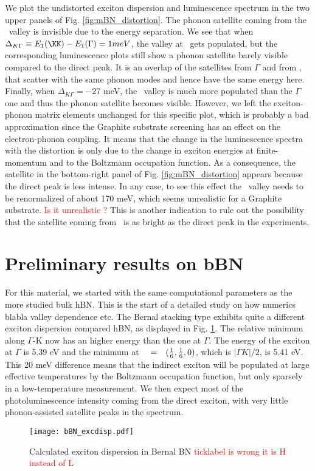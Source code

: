 We plot the undistorted exciton dispersion and luminescence spectrum in the two upper panels of Fig. \ref{fig:mBN_distortion}. The phonon satellite coming from the \KK~valley is invisible due to the energy separation. We see that when $\Delta_{K\Gamma} \equiv E_1(\KK) - E_1(\Gamma) = 1 meV$, the valley at \KK~gets populated, but the corresponding luminescence plots still show a phonon satellite barely visible compared to the direct peak. It is an overlap of the satellites from $\Gamma$ and from \KK, that scatter with the same phonon modes and hence have the same energy here. Finally, when $\Delta_{K\Gamma} = -27$ meV, the \KK~valley is much more populated than the $\Gamma$ one and thus the phonon satellite becomes visible. However, we left the exciton-phonon matrix elements unchanged for this specific plot, which is probably a bad approximation since the Graphite substrate screening has an effect on the electron-phonon coupling.\cite{sohier2021remote} It means that the change in the luminescence spectra with the distortion is only due to the change in exciton energies at finite-momentum and to the Boltzmann occupation function. As a consequence, the satellite in the bottom-right panel of Fig. \ref{fig:mBN_distortion} appears because the direct peak is less intense. In any case, to see this effect the \KK~valley needs to be renormalized of about 170 meV, which seems unrealistic for a Graphite substrate. \textcolor{red}{Is it unrealistic ?} This is another indication to rule out the possibility that the satellite coming from \KK~is as bright as the direct peak in the experiments.

%
\section{Preliminary results on bBN}
For this material, we started with the same computational parameters as the more studied bulk \acrshort{hBN}. This is the start of a detailed study on how numerics blabla valley dependence etc.
The Bernal stacking type exhibits quite a different exciton dispersion compared hBN, as displayed in Fig. \ref{fig:bBN_excdisp}. The relative minimum along $\Gamma$-K now has an higher energy than the one at $\Gamma$. The energy of the exciton at $\Gamma$ is 5.39 eV and the minimum at $\qq=(\tfrac{1}{6},\tfrac{1}{6},0)$, which is $|\Gamma K|/2$, is 5.41 eV. This $20$ meV difference means that the indirect exciton will be populated at large effective temperatures by the Boltzmann occupation function, but only sparsely in a low-temperature measurement. We then expect most of the photoluminescence intensity coming from the direct exciton, with very little phonon-assisted satellite peaks in the spectrum.
\begin{figure}[H]
	\vspace{0.2cm}
	\setcapindent{2em}
	\centering
	\texttt{[image: bBN\_excdisp.pdf]}
	\caption{Calculated exciton dispersion in Bernal BN \textcolor{red}{ticklabel is wrong it is H instead of L}} %
    \label{fig:bBN_excdisp}
\end{figure}

